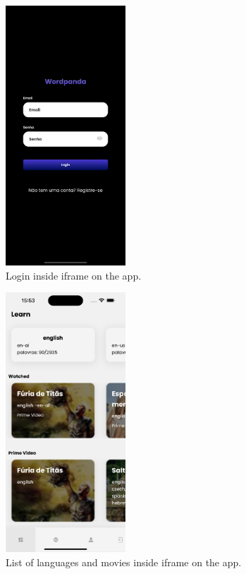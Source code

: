 \documentclass[12pt]{article}
\begin{document}
  \begin{figure}[h]
    \centering
    \caption{
    Login inside iframe on the app.
    }
    \label{fig:app1}
    \includegraphics[width=0.4\textwidth]{assets/14.png}
  \end{figure}

  \begin{figure}[h]
    \centering
    \caption{
     List of languages and movies inside iframe on the app.
    }
    \label{fig:app2}
    \includegraphics[width=0.4\textwidth]{assets/15.png}
  \end{figure}
\end{document}

